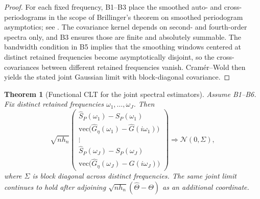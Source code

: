 \documentclass[11pt]{article}
\newtheorem{theorem}{Theorem}[section]
\newcommand{\Ghat}{\widehat{G}}
\newcommand{\REV}{}
\begin{document}
\begin{proof}
\REV
For each fixed frequency, B1--B3 place the smoothed auto- and cross-periodograms in the scope of Brillinger's theorem on smoothed periodogram asymptotics; see \cite[Thm.~7.4.2]{Brillinger2001}. The covariance kernel depends on second- and fourth-order spectra only, and B3 ensures those are finite and absolutely summable. The bandwidth condition in B5 implies that the smoothing windows centered at distinct retained frequencies become asymptotically disjoint, so the cross-covariances between different retained frequencies vanish. Cram\'er--Wold then yields the stated joint Gaussian limit with block-diagonal covariance.
\end{proof}

\begin{theorem}[Functional CLT for the joint spectral estimators]\label{thm:functional-clt}\REV
Assume B1--B6. Fix distinct retained frequencies $\omega_1,\dots,\omega_J$. Then
\[
  \sqrt{n h_n}
  \left(
    \begin{array}{c}
      \widehat{S}_P(\omega_1)-S_P(\omega_1) \\
      \mathrm{vec}\big(\widehat{G}_\eta(\omega_1)-\Ghat(i\omega_1)\big) \\
      \vdots \\
      \widehat{S}_P(\omega_J)-S_P(\omega_J) \\
      \mathrm{vec}\big(\widehat{G}_\eta(\omega_J)-\Ghat(i\omega_J)\big)
    \end{array}
  \right)
  \Rightarrow
  \mathcal N(0,\Sigma),
\]
where $\Sigma$ is block diagonal across distinct frequencies. The same joint limit continues to hold after adjoining $\sqrt{n h_n}(\widehat\Theta-\Theta)$ as an additional coordinate.
\end{theorem}
\end{document}
